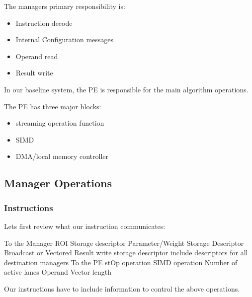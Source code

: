 \documentclass[journal]{IEEEtran}
\begin{document}
The managers primary responsibility is:

\begin{itemize}
    \item Instruction decode
    \item Internal Configuration messages
    \item Operand read
    \item Result write
\end{itemize}

In our baseline system, the PE is responsible for the main algorithm operations.

The PE has three major blocks:

\begin{itemize}
    \item streaming operation function
    \item SIMD
    \item DMA/local memory controller
\end{itemize}

\subsection{Manager Operations}
\label{sec:Manager Operations}

\subsubsection{Instructions}
\label{ssec:Instructions}
Lets first review what our instruction communicates:

\begin{outline}
        \1 To the Manager
            \2 ROI Storage descriptor
            \2 Parameter/Weight Storage Descriptor
                \3 Broadcast or Vectored
            \2 Result write storage descriptor
                \3 include descriptors for all destination managers
        \1 To the PE
            \2 stOp operation
            \2 SIMD operation
            \2 Number of active lanes
            \2 Operand Vector length
\end{outline}

Our instructions have to include information to control the above operations.
\end{document}
